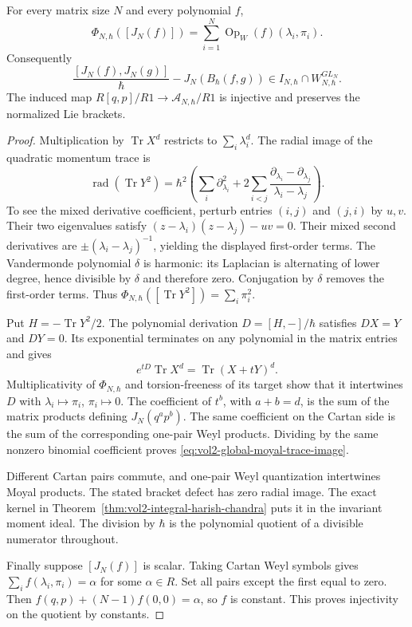 \begin{theorem}\label{thm:vol2-global-moyal-trace}
For every matrix size $N$ and every polynomial $f$,
\begin{equation}\label{eq:vol2-global-moyal-trace-image}
 \Phi_{N,\hbar}([J_N(f)])
     =\sum_{i=1}^N\operatorname{Op}_W(f)(\lambda_i,\pi_i).
\end{equation}
Consequently
\[
 \frac{[J_N(f),J_N(g)]}{\hbar}-J_N(B_\hbar(f,g))
       \in I_{N,\hbar}\cap W_{N,\hbar}^{GL_N}.
\]
The induced map
$R[q,p]/R1\to\mathcal A_{N,\hbar}/R1$ is injective
and preserves the normalized Lie brackets.
\end{theorem}

\begin{proof}
Multiplication by $\operatorname{Tr}X^d$ restricts to
$\sum_i\lambda_i^d$.
The radial image of the quadratic momentum trace is
\[
 \operatorname{rad}(\operatorname{Tr}Y^2)
 =\hbar^2\left(
   \sum_i\partial_{\lambda_i}^2
    +2\sum_{i<j}
       \frac{\partial_{\lambda_i}-\partial_{\lambda_j}}
            {\lambda_i-\lambda_j}\right).
\]
To see the mixed derivative coefficient, perturb entries
$(i,j)$ and $(j,i)$ by $u,v$. Their two eigenvalues satisfy
$(z-\lambda_i)(z-\lambda_j)-uv=0$.
Their mixed second derivatives are
$\pm(\lambda_i-\lambda_j)^{-1}$, yielding the displayed
first-order terms.
The Vandermonde polynomial $\delta$ is harmonic:
its Laplacian is alternating of lower degree, hence
divisible by $\delta$ and therefore zero.
Conjugation by $\delta$ removes the first-order terms.
Thus $\Phi_{N,\hbar}([\operatorname{Tr}Y^2])
 =\sum_i\pi_i^2$.

Put $H=-\operatorname{Tr}Y^2/2$.
The polynomial derivation $D=[H,-]/\hbar$ satisfies
$DX=Y$ and $DY=0$.
Its exponential terminates on any polynomial in the
matrix entries and gives
\[
 e^{tD}\operatorname{Tr}X^d
      =\operatorname{Tr}(X+tY)^d.
\]
Multiplicativity of $\Phi_{N,\hbar}$ and torsion-freeness
of its target show that it intertwines $D$ with
$\lambda_i\mapsto\pi_i$, $\pi_i\mapsto0$.
The coefficient of $t^b$, with $a+b=d$, is the sum of
the matrix products defining $J_N(q^ap^b)$.
The same coefficient on the Cartan side is the sum of
the corresponding one-pair Weyl products.
Dividing by the same nonzero binomial coefficient proves
\eqref{eq:vol2-global-moyal-trace-image}.

Different Cartan pairs commute, and one-pair Weyl
quantization intertwines Moyal products. The stated
bracket defect has zero radial image.
The exact kernel in
Theorem~\ref{thm:vol2-integral-harish-chandra} puts it
in the invariant moment ideal.
The division by $\hbar$ is the polynomial quotient of
a divisible numerator throughout.

Finally suppose $[J_N(f)]$ is scalar.
Taking Cartan Weyl symbols gives
$\sum_i f(\lambda_i,\pi_i)=\alpha$ for some $\alpha\in R$.
Set all pairs except the first equal to zero. Then
$f(q,p)+(N-1)f(0,0)=\alpha$, so $f$ is constant.
This proves injectivity on the quotient by constants.
\end{proof}


